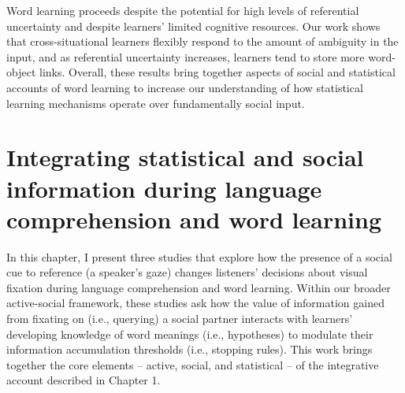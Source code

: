 \documentclass[oneside]{report}
\begin{document}
Word learning proceeds despite the potential for high levels of
referential uncertainty and despite learners' limited cognitive
resources. Our work shows that cross-situational learners flexibly
respond to the amount of ambiguity in the input, and as referential
uncertainty increases, learners tend to store more word-object links.
Overall, these results bring together aspects of social and statistical
accounts of word learning to increase our understanding of how
statistical learning mechanisms operate over fundamentally social input.

\chapter{Integrating statistical and social information during language
comprehension and word
learning}\label{integrating-statistical-and-social-information-during-language-comprehension-and-word-learning}


In this chapter, I present three studies that explore how the presence
of a social cue to reference (a speaker's gaze) changes listeners'
decisions about visual fixation during language comprehension and word
learning. Within our broader active-social framework, these studies ask
how the value of information gained from fixating on (i.e., querying) a
social partner interacts with learners' developing knowledge of word
meanings (i.e., hypotheses) to modulate their information accumulation
thresholds (i.e., stopping rules). This work brings together the core
elements -- active, social, and statistical -- of the integrative
account described in Chapter 1.
\end{document}
